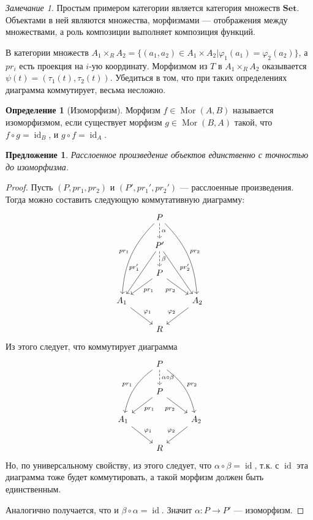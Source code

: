 \documentclass{article}
\newtheorem*{proposition}{Предложение}
\theoremstyle{definition}
\newtheorem*{definition}{Определение}
\theoremstyle{remark}
\newtheorem*{remark}{Замечание}
\DeclareMathOperator{\id}{id}
\DeclareMathOperator{\Mor}{Mor}
\begin{document}
\begin{remark}
    Простым примером категории является категория множеств $\mathbf{Set}$. Объектами в ней являются множества, морфизмами --- отображения между множествами, а роль композиции выполняет композиция функций.

    В категории множеств $A_1 \times_R A_2 = \{ (a_1, a_2) \in A_1 \times A_2 | \varphi_1(a_1) = \varphi_2(a_2) \}$, а $pr_i$ есть проекция на $i$-ую координату. Морфизмом из $T$ в $A_1 \times_R A_2$ оказывается $\psi(t) = (\tau_1(t), \tau_2(t))$. Убедиться в том, что при таких определениях диаграмма коммутирует, весьма несложно.
\end{remark}

\begin{definition}[Изоморфизм]
    Морфизм $f \in \Mor(A, B)$ называется изоморфизмом, если существует морфизм $g \in \Mor(B, A)$ такой, что $f \circ g = \id_B$, и $g \circ f = \id_A$.
\end{definition}

\begin{proposition}
    \label{123}
    Расслоенное произведение объектов единственно с точностью до изоморфизма.
\end{proposition}
\begin{proof}
    Пусть $(P, pr_1, pr_2)$ и $(P', pr_1', pr_2')$ --- расслоенные произведения. Тогда можно составить следующую коммутативную диаграмму:
    \begin{equation*}
    \begin{tikzcd}
        & P \ar[dashed]{d}{\alpha} \ar[bend right=20, swap]{dddl}{pr_1} \ar[bend left=20]{dddr}{pr_2} & \\
        & P' \ar[dashed]{d}{\beta} \ar[swap]{ddl}{pr_1'} \ar{ddr}{pr_2'} & \\
        & P \ar{dl}{pr_1} \ar[swap]{dr}{pr_2} & \\
        A_1 \ar{dr}{\varphi_1} & & A_2 \ar[swap]{dl}{\varphi_2} \\
        & R &
    \end{tikzcd}
    \end{equation*}
    Из этого следует, что коммутирует диаграмма
    \begin{equation*}
    \begin{tikzcd}
        & P \ar[dashed]{d}{\alpha \circ \beta} \ar[bend right=20, swap]{ddl}{pr_1} \ar[bend left=20]{ddr}{pr_2} & \\
        & P \ar{dl}{pr_1} \ar[swap]{dr}{pr_2} & \\
        A_1 \ar{dr}{\varphi_1} & & A_2 \ar[swap]{dl}{\varphi_2} \\
        & R &
    \end{tikzcd}
    \end{equation*}
    Но, по универсальному свойству, из этого следует, что $\alpha \circ \beta = \id$, т.к. с $\id$ эта диаграмма тоже будет коммутировать, а такой морфизм должен быть единственным.

    Аналогично получается, что и $\beta \circ \alpha = \id$. Значит $\alpha: P \to P'$ --- изоморфизм.
\end{proof}
\end{document}
